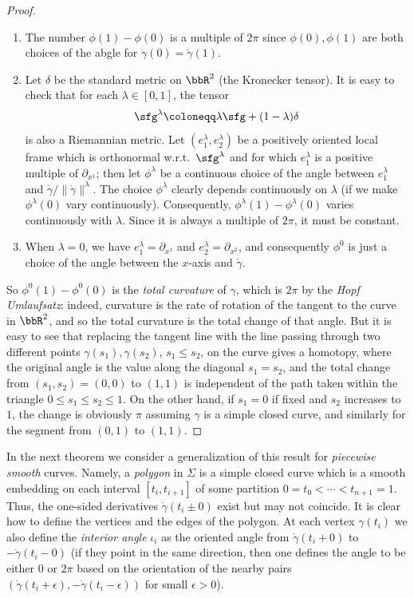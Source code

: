 \begin{proof}
    \begin{enumerate}[label=(\arabic*)]
        \item The number $\phi(1)-\phi(0)$ is a multiple of $2\pi$ since $\phi(0),\phi(1)$ are both choices of the abgle for $\dot\gamma(0)=\dot\gamma(1)$.
        \item Let $\delta$ be the standard metric on $\bbR^2$ (the Kronecker tensor). It is easy to check that for each $\lambda\in [0,1]$, the tensor 
        \[\sfg^\lambda\coloneqq \lambda\sfg+(1-\lambda)\delta\]
        is also a Riemannian metric. Let $(e_1^\lambda, e_2^\lambda)$ be a positively oriented local frame which is orthonormal w.r.t.\ $\sfg^\lambda$ and for which $e_1^\lambda$ is a positive multiple of $\partial_{x^1}$; then let $\phi^\lambda$ be a continuous choice of the angle between $e_1^\lambda$ and $\dot\gamma/\lVert\dot\gamma\rVert^\lambda$. The choice $\phi^\lambda$ clearly depends continuously on $\lambda$ (if we make $\phi^\lambda(0)$ vary continuously). Consequently, $\phi^\lambda(1)-\phi^\lambda(0)$ varies continuously with $\lambda$. Since it is always a multiple of $2\pi$, it must be constant.
        \item When $\lambda=0$, we have $e_1^\lambda=\partial_{x^1}$ and $e_2^\lambda=\partial_{x^2}$, and consequently $\phi^0$ is just a choice of the angle between the $x$-axis and $\dot\gamma$. 
    \end{enumerate}
    So $\phi^0(1)-\phi^0(0)$ is the \emph{total curvature} of $\gamma$, which is  $2\pi$ by the \emph{Hopf Umlaufsatz}: indeed, curvature is the rate of rotation of the tangent to the curve in $\bbR^2$, and so the total curvature is the total change of that angle. But it is easy to see that replacing the tangent line with the line passing through two different points $\gamma(s_1),\gamma(s_2)$, $s_1\leq s_2$, on the curve gives a homotopy, where the original angle is the value along the diagonal $s_1=s_2$, and the total change from $(s_1,s_2)=(0,0)$ to $(1,1)$ is independent of the path taken within the triangle $0\leq s_1\leq s_2\leq 1$. On the other hand, if $s_1=0$ if fixed and $s_2$ increases to $1$, the change is obviously $\pi$ assuming $\gamma$ is a simple closed curve, and similarly for the segment from $(0,1)$ to $(1,1)$.
\end{proof}


In the next theorem we consider a generalization of this result for \emph{piecewise smooth} curves. Namely, a \emph{polygon} in $\Sigma$ is a simple closed curve which is a smooth embedding on each interval $[t_i,t_{i+1}]$ of some partition $0=t_0<\cdots<t_{n+1}=1$. Thus, the one-sided derivatives $\dot\gamma(t_i\pm 0)$ exist but may not coincide. It is clear how to define the vertices and the edges of the polygon. At each vertex $\gamma(t_i)$ we also define the \emph{interior angle} $\iota_i$ as the oriented angle from $\dot\gamma(t_i+0)$ to $-\dot\gamma(t_i-0)$ (if they point in the same direction, then one defines the angle to be either $0$ or $2\pi$ based on the orientation of the nearby pairs $(\dot\gamma(t_i+\epsilon),-\dot\gamma(t_i-\epsilon))$ for small $\epsilon>0$).

